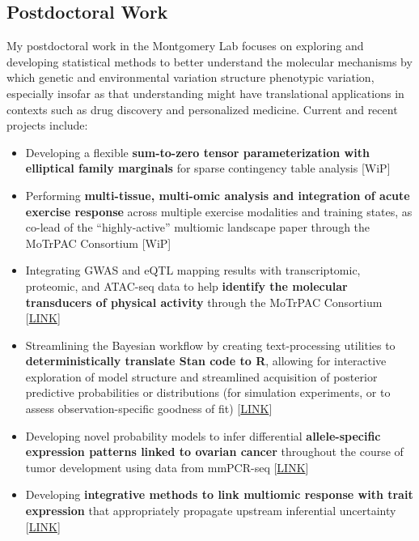 \documentclass[12pt]{article}
\begin{document}
\subsection{Postdoctoral Work}

My postdoctoral work in the Montgomery Lab focuses on exploring and developing statistical methods to better understand the molecular mechanisms by which genetic and environmental variation structure phenotypic variation, especially insofar as that understanding might have translational applications in contexts such as drug discovery and personalized medicine.  Current and recent projects include:

\begin{itemize}[noitemsep]

\item Developing a flexible \textbf{sum-to-zero tensor parameterization with elliptical family marginals} for sparse contingency table analysis [WiP]

\item Performing \textbf{multi-tissue, multi-omic analysis and integration of acute exercise response} across multiple exercise modalities and training states, as co-lead of the ``highly-active'' multiomic landscape paper through the MoTrPAC Consortium [WiP]

\item Integrating GWAS and eQTL mapping results with transcriptomic, proteomic, and ATAC-seq data to help \textbf{identify the molecular transducers of physical activity} through the MoTrPAC Consortium [\href{https://github.com/NikVetr/MoTrPAC\_Complex\_Traits}{LINK}]

\item Streamlining the Bayesian workflow by creating text-processing utilities to \textbf{deterministically translate Stan code to R}, allowing for interactive exploration of model structure and streamlined acquisition of posterior predictive probabilities or distributions (for simulation experiments, or to assess observation-specific goodness of fit) [\href{ https://github.com/NikVetr/montgomery\_lab/blob/master/parse\_Stan.R }{LINK}]

\item Developing novel probability models to infer differential \textbf{allele-specific expression patterns linked to ovarian cancer} throughout the course of tumor development using data from mmPCR-seq [\href{https://github.com/nsabell/egtex-ase}{LINK}]

\item Developing \textbf{integrative methods to link multiomic response with trait expression} that appropriately propagate upstream inferential uncertainty [\href{https://github.com/NikVetr/papers/blob/main/twas-method/proposed\_TWAS\_method.pdf}{LINK}]


\end{itemize}
\end{document}
